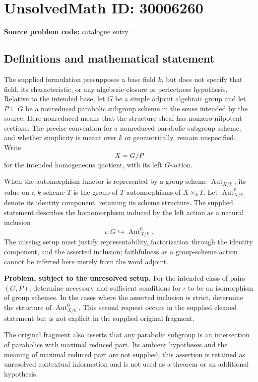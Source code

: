 \documentclass[11pt]{article}
\begin{document}
\section*{UnsolvedMath ID: 30006260}
\textbf{Source problem code:} catalogue entry
\subsection{Definitions and mathematical statement}
The supplied formulation presupposes a base field \(k\), but does not specify that field, its characteristic, or any algebraic-closure or perfectness hypothesis. Relative to the intended base, let \(G\) be a simple adjoint algebraic group and let \(P\subseteq G\) be a nonreduced parabolic subgroup scheme in the sense intended by the source. Here nonreduced means that the structure sheaf has nonzero nilpotent sections. The precise convention for a nonreduced parabolic subgroup scheme, and whether simplicity is meant over \(k\) or geometrically, remain unspecified. Write
\[
X=G/P
\]
for the intended homogeneous quotient, with its left \(G\)-action.

When the automorphism functor is represented by a group scheme \(\operatorname{Aut}_{X/k}\), its value on a \(k\)-scheme \(T\) is the group of \(T\)-automorphisms of \(X\times_k T\). Let \(\operatorname{Aut}_{X/k}^{0}\) denote its identity component, retaining its scheme structure. The supplied statement describes the homomorphism induced by the left action as a natural inclusion
\[
\iota:G\hookrightarrow\operatorname{Aut}_{X/k}^{0}.
\]
The missing setup must justify representability, factorization through the identity component, and the asserted inclusion; faithfulness as a group-scheme action cannot be inferred here merely from the word adjoint.

\textbf{Problem, subject to the unresolved setup.} For the intended class of pairs \((G,P)\), determine necessary and sufficient conditions for \(\iota\) to be an isomorphism of group schemes. In the cases where the asserted inclusion is strict, determine the structure of \(\operatorname{Aut}_{X/k}^{0}\). This second request occurs in the supplied cleaned statement but is not explicit in the supplied original fragment.

The original fragment also asserts that any parabolic subgroup is an intersection of parabolics with maximal reduced part. Its ambient hypotheses and the meaning of maximal reduced part are not supplied; this assertion is retained as unresolved contextual information and is not used as a theorem or an additional hypothesis.
\end{document}
